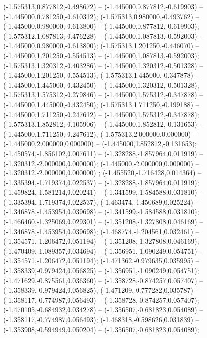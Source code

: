  (-1.575313,0.877812,-0.498672) -- (-1.445000,0.877812,-0.619903) -- (-1.445000,0.781250,-0.610312);
 (-1.575313,0.980000,-0.493762) -- (-1.445000,0.980000,-0.613800) -- (-1.445000,0.877812,-0.619903);
 (-1.575312,1.087813,-0.476228) -- (-1.445000,1.087813,-0.592003) -- (-1.445000,0.980000,-0.613800);
 (-1.575313,1.201250,-0.446070) -- (-1.445000,1.201250,-0.554513) -- (-1.445000,1.087813,-0.592003);
 (-1.575313,1.320312,-0.403286) -- (-1.445000,1.320312,-0.501328) -- (-1.445000,1.201250,-0.554513);
 (-1.575313,1.445000,-0.347878) -- (-1.445000,1.445000,-0.432450) -- (-1.445000,1.320312,-0.501328);
 (-1.575313,1.575312,-0.279846) -- (-1.445000,1.575312,-0.347878) -- (-1.445000,1.445000,-0.432450);
 (-1.575313,1.711250,-0.199188) -- (-1.445000,1.711250,-0.247612) -- (-1.445000,1.575312,-0.347878);
 (-1.575313,1.852812,-0.105906) -- (-1.445000,1.852812,-0.131653) -- (-1.445000,1.711250,-0.247612);
 (-1.575313,2.000000,0.000000) -- (-1.445000,2.000000,0.000000) -- (-1.445000,1.852812,-0.131653);
 (-1.450574,-1.856102,0.007611) -- (-1.328288,-1.857964,0.011919) -- (-1.320312,-2.000000,0.000000);
 (-1.445000,-2.000000,0.000000) -- (-1.320312,-2.000000,0.000000) ;
 (-1.455520,-1.716428,0.014364) -- (-1.335394,-1.719374,0.022537) -- (-1.328288,-1.857964,0.011919);
 (-1.459824,-1.581214,0.020241) -- (-1.341599,-1.584588,0.031810) -- (-1.335394,-1.719374,0.022537);
 (-1.463474,-1.450689,0.025224) -- (-1.346878,-1.453954,0.039698) -- (-1.341599,-1.584588,0.031810);
 (-1.466460,-1.325069,0.029301) -- (-1.351208,-1.327808,0.046169) -- (-1.346878,-1.453954,0.039698);
 (-1.468774,-1.204561,0.032461) -- (-1.354571,-1.206472,0.051194) -- (-1.351208,-1.327808,0.046169);
 (-1.470409,-1.089357,0.034694) -- (-1.356951,-1.090249,0.054751) -- (-1.354571,-1.206472,0.051194);
 (-1.471362,-0.979635,0.035995) -- (-1.358339,-0.979424,0.056825) -- (-1.356951,-1.090249,0.054751);
 (-1.471629,-0.875561,0.036360) -- (-1.358728,-0.874257,0.057407) -- (-1.358339,-0.979424,0.056825);
 (-1.471209,-0.777282,0.035787) -- (-1.358117,-0.774987,0.056493) -- (-1.358728,-0.874257,0.057407);
 (-1.470105,-0.684932,0.034278) -- (-1.356507,-0.681823,0.054089) -- (-1.358117,-0.774987,0.056493);
 (-1.468318,-0.598626,0.031839) -- (-1.353908,-0.594949,0.050204) -- (-1.356507,-0.681823,0.054089);
